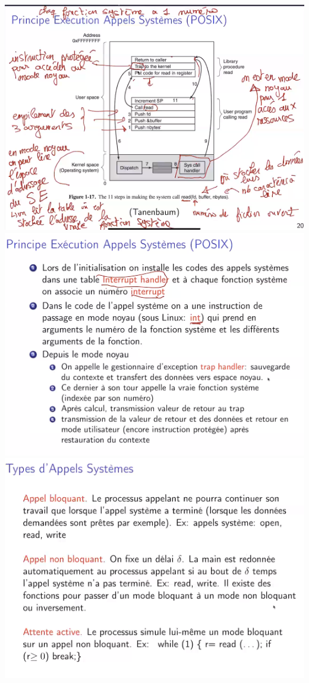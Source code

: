 \documentclass{article}
\begin{document}
    \includegraphics{12.PNG}
    \includegraphics{13.PNG}
    \includegraphics{14.PNG}
\end{document}
